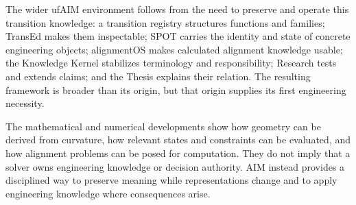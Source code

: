 The wider ufAIM environment follows from the need to preserve and operate this
transition knowledge: a transition registry structures functions and families;
TransEd makes them inspectable; SPOT carries the identity and state of concrete
engineering objects; alignmentOS makes calculated alignment knowledge usable;
the Knowledge Kernel stabilizes terminology and responsibility; Research tests
and extends claims; and the Thesis explains their relation. The resulting
framework is broader than its origin, but that origin supplies its first
engineering necessity.

The mathematical and numerical developments show how geometry can be derived
from curvature, how relevant states and constraints can be evaluated, and how
alignment problems can be posed for computation. They do not imply that a
solver owns engineering knowledge or decision authority. AIM instead provides
a disciplined way to preserve meaning while representations change and to
apply engineering knowledge where consequences arise.
